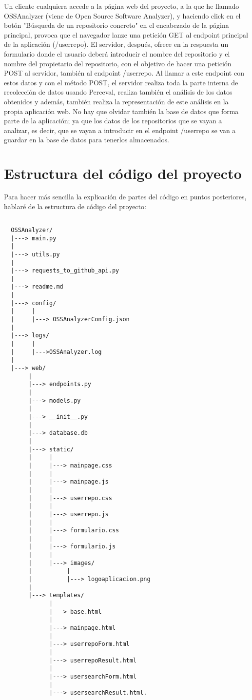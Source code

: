 \documentclass[a4paper, 12pt]{book}
\begin{document}
Un cliente cualquiera accede a la página web del proyecto, a la que he llamado OSSAnalyzer (viene de Open Source Software Analyzer), y haciendo click en el botón "Búsqueda de un repositorio concreto" en el encabezado de la página principal, provoca que el navegador lanze una petición GET al endpoint principal de la aplicación (/userrepo). El servidor, después, ofrece en la respuesta un formulario donde el usuario deberá introducir el nombre del repositorio y el nombre del propietario del repositorio, con el objetivo de hacer una petición POST al servidor, también al endpoint /userrepo. Al llamar a este endpoint con estos datos y con el método POST, el servidor realiza toda la parte interna de recolección de datos usando Perceval, realiza también el análisis de los datos obtenidos y además, también realiza la representación de este análisis en la propia aplicación web. No hay que olvidar también la base de datos que forma parte de la aplicación; ya que los datos de los repositorios que se vayan a analizar, es decir, que se vayan a introducir en el endpoint /userrepo se van a guardar en la base de datos para tenerlos almacenados.

\section{Estructura del código del proyecto} 
\label{sec:Estructura del código del proyecto}

Para hacer más sencilla la explicación de partes del código en puntos posteriores, hablaré de la estructura de código del proyecto:

\begin{verbatim}

  OSSAnalyzer/
  |---> main.py
  |
  |---> utils.py
  |
  |---> requests_to_github_api.py
  |
  |---> readme.md
  |
  |---> config/
  |     |
  |     |---> OSSAnalyzerConfig.json
  |
  |---> logs/     
  |     |  
  |     |--->OSSAnalyzer.log
  |
  |---> web/
       |
       |---> endpoints.py
       |
       |---> models.py
       |
       |---> __init__.py
       |
       |---> database.db
       |
       |---> static/
       |     |
       |     |---> mainpage.css
       |     |
       |     |---> mainpage.js
       |     |
       |     |---> userrepo.css
       |     |
       |     |---> userrepo.js
       |     |
       |     |---> formulario.css
       |     |
       |     |---> formulario.js
       |     | 
       |     |---> images/
       |          |
       |          |---> logoaplicacion.png
       |
       |---> templates/
             |
             |---> base.html
             |
             |---> mainpage.html
             |
             |---> userrepoForm.html
             |
             |---> userrepoResult.html
             |
             |---> usersearchForm.html
             |
             |---> usersearchResult.html.

\end{verbatim}
\end{document}
